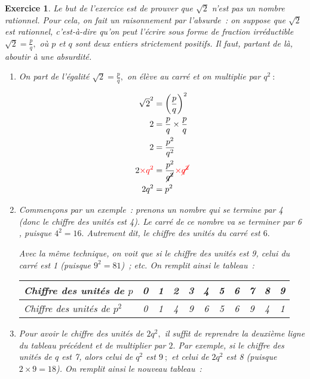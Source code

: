 \documentclass[10pt]{article}
\newtheorem{exo}{Exercice}
\begin{document}
\begin{exo}

Le but de l'exercice est de prouver que  $\sqrt{2}$ n'est pas un nombre rationnel. Pour cela, on fait un raisonnement par l'absurde~: on suppose que $\sqrt{2}$ est rationnel, c'est-à-dire qu'on peut l'écrire sous forme de fraction irréductible $\sqrt{2}=\frac{p}{q},$ où $p$ et $q$ sont deux entiers strictement positifs. Il faut, partant de là, aboutir à une absurdité.

\begin{enumerate}
\item On part de l'égalité  $\sqrt{2}=\frac{p}{q},$ on élève au carré et on multiplie par $q^2~:$

\begin{align*}
\sqrt{2}^2&=\left(\frac{p}{q}\right)^2\\
2&=\frac{p}{q}\times \frac{p}{q}\\
2&=\frac{p^2}{q^2}\\
2\textcolor{red}{\times q^2}&=\frac{p^2}{\cancel{q^2}}\textcolor{red}{\times \cancel{q^2}}\\
2q^2&=p^2
\end{align*}
\item Commençons par un exemple~: prenons un nombre qui \og se termine par 4 \fg~{} (donc le chiffre des unités est 4). Le carré de ce nombre va \og se terminer par 6 \fg, puisque $4^2=16.$ Autrement dit, le chiffre des unités du carré est $6.$

Avec la même technique, on voit que si le chiffre des unités est 9, celui du carré est 1 (puisque $9^2=81$)~; etc. On remplit ainsi le tableau~:

\begin{center}
\begin{tabular}{|l|c|c|c|c|c|c|c|c|c|c|}
\hline
   Chiffre des unités de $p$ &0&1&2&3&4&5&6&7&8&9 \\
	\hline
	Chiffre des unités de $p^2$ &0&1&4&9&6&5&6&9&4&1 \\
	\hline
\end{tabular}
\end{center}
\item Pour avoir le chiffre des unités de $2q^2,$ il suffit de reprendre la deuxième ligne du tableau précédent et de multiplier par $2.$ Par exemple, si le chiffre des unités de $q$ est 7, alors celui de $q^2$ est $9~;$ et celui de $2q^2$ est 8 (puisque $2\times 9=18$). On remplit ainsi le nouveau tableau~:


\end{enumerate}
\end{exo}
\end{document}
